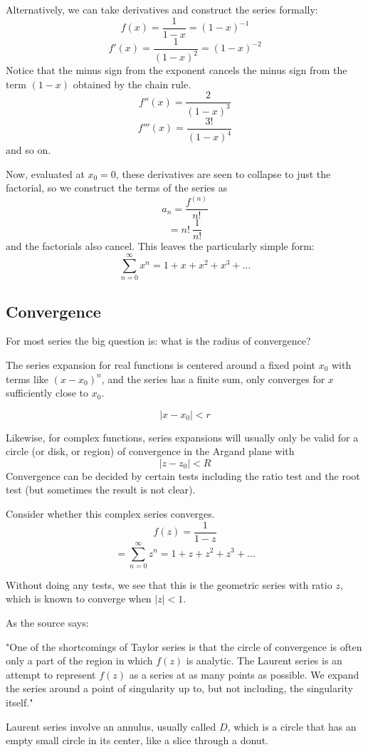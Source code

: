 \documentclass[11pt, oneside]{article}   	%
\begin{document}
Alternatively, we can take derivatives and construct the series formally:
\[ f(x) = \frac{1}{1 - x} = (1-x)^{-1} \]
\[ f'(x) = \frac{1}{(1 - x)^2} = (1-x)^{-2} \]
Notice that the minus sign from the exponent cancels the minus sign from the term $(1-x)$ obtained by the chain rule.  
\[ f''(x) = \frac{2}{(1 - x)^3} \]
\[ f'''(x) = \frac{3!}{(1 - x)^4} \]
and so on.

Now, evaluated at $x_0 = 0$, these derivatives are seen to collapse to just the factorial, so we construct the terms of the series as
\[ a_n = \frac{f^{(n)}}{n!} \]
\[ = n! \ \frac{1}{n!} \]
and the factorials also cancel.  This leaves the particularly simple form:
\[ \sum_{n=0}^{\infty} x^n = 1 + x + x^2 + x^3 + \dots \]

\subsection*{Convergence}
For most series the big question is:  what is the radius of convergence?

The series expansion for real functions is centered around a fixed point $x_0$ with terms like $(x - x_0)^n$, and the series has a finite sum, only converges for $x$ sufficiently close to $x_0$.

\[ |x - x_0| < r \]

Likewise, for complex functions, series expansions will usually only be valid for a circle (or disk, or region) of convergence in the Argand plane with 
\[ | z - z_0 | < R \]
Convergence can be decided by certain tests including the ratio test and the root test (but sometimes the result is not clear).

Consider whether this complex series converges.  
\[ f(z) = \frac{1}{1 - z} \]
\[ =\sum_{n=0}^{\infty} z^n = 1 + z + z^2 + z^3 + \dots \]

Without doing any tests, we see that this is the geometric series with ratio $z$, which is known to converge when $|z| < 1$.

As the source says:  

"One of the shortcomings of Taylor series is that the circle of convergence is often only a part of the region in which $f(z)$ is analytic.  The Laurent series is an attempt to represent $f(z)$ as a series at as many points as possible. We expand the series around a point of singularity up to, but not including, the singularity itself."

Laurent series involve an annulus, usually called $D$, which is a circle that has an empty small circle in its center, like a slice through a donut.
\end{document}
